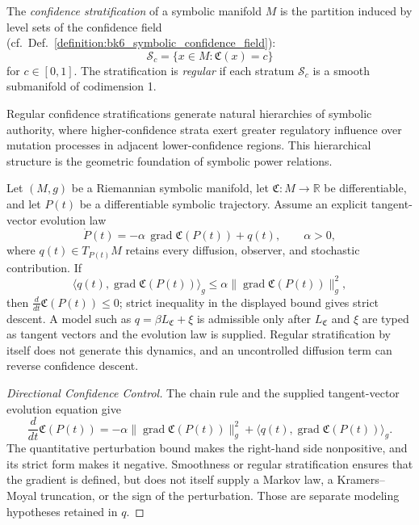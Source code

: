 \begin{definition}
\label{definition:bk6_confidence_stratification}
The \emph{confidence stratification} of a symbolic manifold $M$ is the partition induced by level sets of the confidence field (cf.~Def.~\ref{definition:bk6_symbolic_confidence_field}):
\begin{equation}
\mathcal{S}_c = \{x \in M : \mathfrak{C}(x) = c\}
\end{equation}
for $c \in [0,1]$. The stratification is \emph{regular} if each stratum $\mathcal{S}_c$ is a smooth submanifold of codimension 1.
\end{definition}

Regular confidence stratifications generate natural hierarchies of symbolic authority, where higher-confidence strata exert greater regulatory influence over mutation processes in adjacent lower-confidence regions. This hierarchical structure is the geometric foundation of symbolic power relations.

\begin{proposition}
\label{proposition:bk6_confidence_gradient}
Let $(M,g)$ be a Riemannian symbolic manifold, let $\mathfrak C:M\to\mathbb R$
be differentiable, and let $P(t)$ be a differentiable symbolic trajectory.
Assume an explicit tangent-vector evolution law
\[
 \dot P(t)=-\alpha\,\operatorname{grad}\mathfrak C(P(t))+q(t),
 \qquad \alpha>0,
\]
where $q(t)\in T_{P(t)}M$ retains every diffusion, observer, and stochastic
contribution. If
\[
 \langle q(t),\operatorname{grad}\mathfrak C(P(t))\rangle_g
 \leq \alpha\|\operatorname{grad}\mathfrak C(P(t))\|_g^2,
\]
then $\frac{d}{dt}\mathfrak C(P(t))\leq0$; strict inequality in the displayed
bound gives strict descent. A model such as
$q=\beta L_{\mathfrak C}+\xi$ is admissible only after $L_{\mathfrak C}$ and
$\xi$ are typed as tangent vectors and the evolution law is supplied.
Regular stratification by itself does not generate this dynamics, and an
uncontrolled diffusion term can reverse confidence descent.

\end{proposition}
\begin{proof}[Directional Confidence Control]
\label{proof:bk6_confidence_gradient}
\leavevmode
The chain rule and the supplied tangent-vector evolution equation give
\[
 \frac{d}{dt}\mathfrak C(P(t))
 =-\alpha\|\operatorname{grad}\mathfrak C(P(t))\|_g^2
  +\langle q(t),\operatorname{grad}\mathfrak C(P(t))\rangle_g.
\]
The quantitative perturbation bound makes the right-hand side nonpositive,
and its strict form makes it negative.  Smoothness or regular stratification
ensures that the gradient is defined, but does not itself supply a Markov law,
a Kramers--Moyal truncation, or the sign of the perturbation.  Those are
separate modeling hypotheses retained in $q$.
\end{proof}

